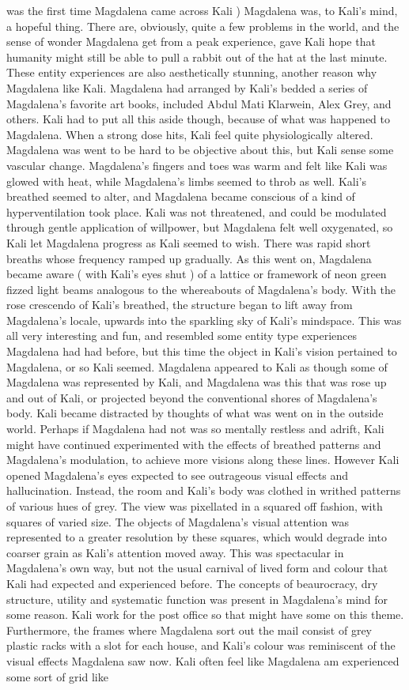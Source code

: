\documentclass[12pt]{book}
\begin{document}
was the first time Magdalena came across Kali ) Magdalena was, to Kali's mind, a hopeful thing. There are, obviously, quite a few problems in the world, and the sense of wonder Magdalena get from a peak experience, gave Kali hope that humanity might still be able to pull a rabbit out of the hat at the last minute. These entity experiences are also aesthetically stunning, another reason why Magdalena like Kali. Magdalena had arranged by Kali's bedded a series of Magdalena's favorite art books, included Abdul Mati Klarwein, Alex Grey, and others. Kali had to put all this aside though, because of what was happened to Magdalena. When a strong dose hits, Kali feel quite physiologically altered. Magdalena was went to be hard to be objective about this, but Kali sense some vascular change. Magdalena's fingers and toes was warm and felt like Kali was glowed with heat, while Magdalena's limbs seemed to throb as well. Kali's breathed seemed to alter, and Magdalena became conscious of a kind of hyperventilation took place. Kali was not threatened, and could be modulated through gentle application of willpower, but Magdalena felt well oxygenated, so Kali let Magdalena progress as Kali seemed to wish. There was rapid short breaths whose frequency ramped up gradually. As this went on, Magdalena became aware ( with Kali's eyes shut ) of a lattice or framework of neon green fizzed light beams analogous to the whereabouts of Magdalena's body. With the rose crescendo of Kali's breathed, the structure began to lift away from Magdalena's locale, upwards into the sparkling sky of Kali's mindspace. This was all very interesting and fun, and resembled some entity type experiences Magdalena had had before, but this time the object in Kali's vision pertained to Magdalena, or so Kali seemed. Magdalena appeared to Kali as though some of Magdalena was represented by Kali, and Magdalena was this that was rose up and out of Kali, or projected beyond the conventional shores of Magdalena's body. Kali became distracted by thoughts of what was went on in the outside world. Perhaps if Magdalena had not was so mentally restless and adrift, Kali might have continued experimented with the effects of breathed patterns and Magdalena's modulation, to achieve more visions along these lines. However Kali opened Magdalena's eyes expected to see outrageous visual effects and hallucination. Instead, the room and Kali's body was clothed in writhed patterns of various hues of grey. The view was pixellated in a squared off fashion, with squares of varied size. The objects of Magdalena's visual attention was represented to a greater resolution by these squares, which would degrade into coarser grain as Kali's attention moved away. This was spectacular in Magdalena's own way, but not the usual carnival of lived form and colour that Kali had expected and experienced before. The concepts of beaurocracy, dry structure, utility and systematic function was present in Magdalena's mind for some reason. Kali work for the post office so that might have some  on this theme. Furthermore, the frames where Magdalena sort out the mail consist of grey plastic racks with a slot for each house, and Kali's colour was reminiscent of the visual effects Magdalena saw now. Kali often feel like Magdalena am experienced some sort of grid like 
\end{document}
